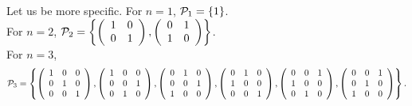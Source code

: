Let us be more specific.
For $n=1$, ${\cal P}_1=\{1\}$.\\
For $n=2$, ${\cal P}_2=\left\{
\left(
\begin{array}{cc}
1&0\\
0&1
\end{array}
\right)
,
\left(
\begin{array}{cc}
0&1\\
1&0
\end{array}
\right)
\right\}$.\\
For $n=3$,
$${\cal P}_3=\left\{
\left(
\begin{array}{ccc}
1&0&0\\
0&1&0\\
0&0&1
\end{array}
\right)
,
\left(
\begin{array}{ccc}
1&0&0\\
0&0&1\\
0&1&0
\end{array}
\right)
,
\left(
\begin{array}{ccc}
0&1&0\\
0&0&1\\
1&0&0
\end{array}
\right)
,
\left(
\begin{array}{ccc}
0&1&0\\
1&0&0\\
0&0&1
\end{array}
\right)
,
\left(
\begin{array}{ccc}
0&0&1\\
1&0&0\\
0&1&0
\end{array}
\right)
,
\left(
\begin{array}{ccc}
0&0&1\\
0&1&0\\
1&0&0
\end{array}
\right)\right\}
.           $$

